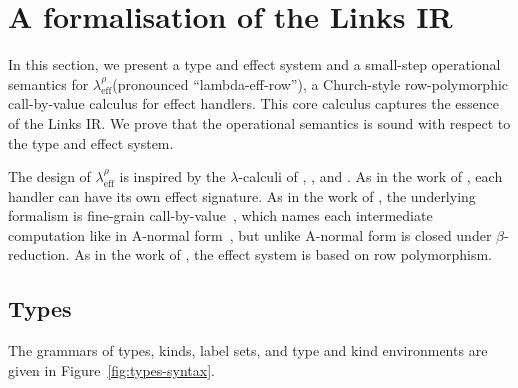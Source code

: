 \documentclass[12pt,mscres,cdtppar,twoside,openright,logo,rightchapter,normalheadings]{infthesis}
\theoremstyle{definition}
\newcommand{\Calc}{\ensuremath{\lambda_{\text{eff}}^\rho}\xspace}
\begin{document}
\section{A formalisation of the Links IR}
\label{sec:lambe-eff-row}

In this section, we present a type and effect system and a small-step
operational semantics for \Calc (pronounced ``lambda-eff-row''), a
Church-style row-polymorphic call-by-value calculus for effect
handlers.
%
This core calculus captures the essence of the Links IR.
%
We prove that the operational semantics is sound with respect to the
type and effect system.


The design of \Calc is inspired by the $\lambda$-calculi of
\citet{Kammar2013}, \citet{Pretnar2015}, and \citet{Lindley2012}.
%
As in the work of \citet{Kammar2013}, each handler can have its own
effect signature. As in the work of \citet{Pretnar2015}, the
underlying formalism is fine-grain call-by-value~\citep{LevyPT03},
which names each intermediate computation like in A-normal
form~\citep{Flanagan1993}, but unlike A-normal form is closed under
$\beta$-reduction. As in the work of \citet{Lindley2012}, the effect
system is based on row polymorphism.

\subsection{Types}
The grammars of types, kinds, label sets, and type and kind
environments are given in Figure~\ref{fig:types-syntax}.
\end{document}
